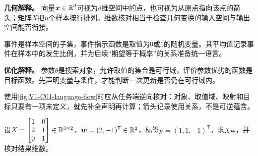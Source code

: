 \documentclass[UTF8,a4paper,11pt,openany]{ctexbook}
\begin{document}
\setcounter{page}{4}
\setcounter{chapter}{1}
\setcounter{figure}{0}
\pagestyle{headings}
\begin{geometrybox}
\textbf{几何解释。} 向量$\boldsymbol{x}\in\mathbb{R}^d$可视为$d$维空间中的点，也可视为从原点指向该点的箭头；矩阵$X$把$n$个样本按行排列。维数核对相当于检查几何变换的输入空间与输出空间能否衔接。
\end{geometrybox}
\begin{probabilitybox}
事件是样本空间的子集，事件指示函数是取值为$0$或$1$的随机变量。其平均值记录事件在样本中的发生比例，并为后续“期望等于概率”的关系准备统一语言。
\end{probabilitybox}
\begin{optimizationbox}
\textbf{优化解释。} 参数$\theta$是搜索对象，允许取值的集合是可行域，评价参数优劣的函数是目标函数。先声明变量与条件，才能判断一次更新是否仍在可行域内。
\end{optimizationbox}

使用\cref{fig:V1-C01-language-flow}时应从任务端逆向核对：对象、取值域、映射和目标只要有一项未定义，就先补全声明再计算；箭头记录使用关系，不是可逆蕴含。
\begin{example}[三样本数据的类型核对]
设$X=\begin{bmatrix}1&0\\2&1\\0&1\end{bmatrix}\in\mathbb{R}^{3\times2}$，$\boldsymbol{w}=(2,-1)^{\mathsf T}\in\mathbb{R}^2$，标签$\boldsymbol{y}=(1,1,-1)^{\mathsf T}$。求$X\boldsymbol{w}$，并核对结果维数。
\end{example}
\end{document}
